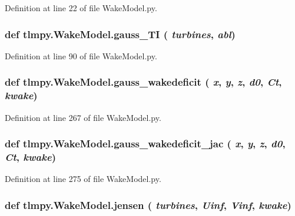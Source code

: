 Definition at line 22 of file WakeModel.py.\hypertarget{namespacetlmpy_1_1WakeModel_a886be027dedbbc967ee8b8ffb7290ed4}{
\subsubsection[{gauss\_\-TI}]{\setlength{\rightskip}{0pt plus 5cm}def tlmpy.WakeModel.gauss\_\-TI ( {\em turbines}, \/   {\em abl})}}
\label{namespacetlmpy_1_1WakeModel_a886be027dedbbc967ee8b8ffb7290ed4}


Definition at line 90 of file WakeModel.py.\hypertarget{namespacetlmpy_1_1WakeModel_a8fe24afad7328d8f4ce1ae5ee548678e}{
\subsubsection[{gauss\_\-wakedeficit}]{\setlength{\rightskip}{0pt plus 5cm}def tlmpy.WakeModel.gauss\_\-wakedeficit ( {\em x}, \/   {\em y}, \/   {\em z}, \/   {\em d0}, \/   {\em Ct}, \/   {\em kwake})}}
\label{namespacetlmpy_1_1WakeModel_a8fe24afad7328d8f4ce1ae5ee548678e}


Definition at line 267 of file WakeModel.py.\hypertarget{namespacetlmpy_1_1WakeModel_a47b74567181b38c2148ad48928b1fc2f}{
\subsubsection[{gauss\_\-wakedeficit\_\-jac}]{\setlength{\rightskip}{0pt plus 5cm}def tlmpy.WakeModel.gauss\_\-wakedeficit\_\-jac ( {\em x}, \/   {\em y}, \/   {\em z}, \/   {\em d0}, \/   {\em Ct}, \/   {\em kwake})}}
\label{namespacetlmpy_1_1WakeModel_a47b74567181b38c2148ad48928b1fc2f}


Definition at line 275 of file WakeModel.py.\hypertarget{namespacetlmpy_1_1WakeModel_ad5cb03923dca50b88770a990920dc2d8}{
\subsubsection[{jensen}]{\setlength{\rightskip}{0pt plus 5cm}def tlmpy.WakeModel.jensen ( {\em turbines}, \/   {\em Uinf}, \/   {\em Vinf}, \/   {\em kwake})}}
\label{namespacetlmpy_1_1WakeModel_ad5cb03923dca50b88770a990920dc2d8}


